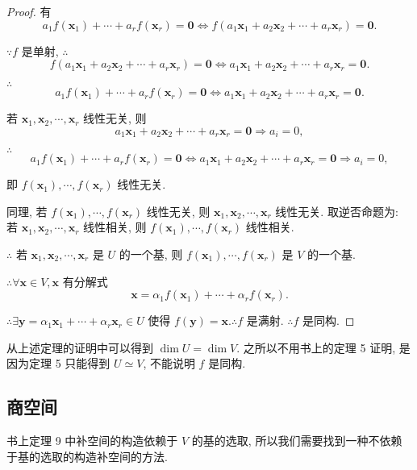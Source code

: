 \documentclass{ctexart}
\begin{document}
\begin{proof}
    有
    \[a_1f(\boldsymbol{x}_1)+\cdots+a_rf(\boldsymbol{x}_r)=\boldsymbol{0}\Leftrightarrow f(a_1\boldsymbol{x}_1+a_2\boldsymbol{x}_2+\cdots+a_r\boldsymbol{x}_r)=\boldsymbol{0}.\]

    $\because f$ 是单射, $\therefore$
    \[f(a_1\boldsymbol{x}_1+a_2\boldsymbol{x}_2+\cdots+a_r\boldsymbol{x}_r)=\boldsymbol{0}\Leftrightarrow a_1\boldsymbol{x}_1+a_2\boldsymbol{x}_2+\cdots+a_r\boldsymbol{x}_r=\boldsymbol{0}.\]

    $\therefore$
    \[a_1f(\boldsymbol{x}_1)+\cdots+a_rf(\boldsymbol{x}_r)=\boldsymbol{0}\Leftrightarrow a_1\boldsymbol{x}_1+a_2\boldsymbol{x}_2+\cdots+a_r\boldsymbol{x}_r=\boldsymbol{0}.\]
    
    若 $\boldsymbol{x}_1,\boldsymbol{x}_2,\cdots,\boldsymbol{x}_r$ 线性无关, 则
    \[a_1\boldsymbol{x}_1+a_2\boldsymbol{x}_2+\cdots+a_r\boldsymbol{x}_r=\boldsymbol{0}\Rightarrow a_i=0,\]

    $\therefore$
    \[a_1f(\boldsymbol{x}_1)+\cdots+a_rf(\boldsymbol{x}_r)=\boldsymbol{0}\Leftrightarrow a_1\boldsymbol{x}_1+a_2\boldsymbol{x}_2+\cdots+a_r\boldsymbol{x}_r=\boldsymbol{0}\Rightarrow a_i=0,\]

    即 $f(\boldsymbol{x}_1),\cdots,f(\boldsymbol{x}_r)$ 线性无关.

    同理, 若 $f(\boldsymbol{x}_1),\cdots,f(\boldsymbol{x}_r)$ 线性无关, 则 $\boldsymbol{x}_1,\boldsymbol{x}_2,\cdots,\boldsymbol{x}_r$ 线性无关. 取逆否命题为: 若 $\boldsymbol{x}_1,\boldsymbol{x}_2,\cdots,\boldsymbol{x}_r$ 线性相关, 则 $f(\boldsymbol{x}_1),\cdots,f(\boldsymbol{x}_r)$ 线性相关.

    $\therefore$ 若 $\boldsymbol{x}_1,\boldsymbol{x}_2,\cdots,\boldsymbol{x}_r$ 是 $U$ 的一个基, 则 $f(\boldsymbol{x}_1),\cdots,f(\boldsymbol{x}_r)$ 是 $V$ 的一个基.

    $\therefore\forall\boldsymbol{x}\in V,\boldsymbol{x}$ 有分解式
    \[\boldsymbol{x}=\alpha_1f(\boldsymbol{x}_1)+\cdots+\alpha_rf(\boldsymbol{x}_r).\]

    $\therefore\exists\boldsymbol{y}=\alpha_1\boldsymbol{x}_1+\cdots+\alpha_r\boldsymbol{x}_r\in U$ 使得 $f(\boldsymbol{y})=\boldsymbol{x}.\therefore f$ 是满射. $\therefore f$ 是同构.
\end{proof}
\begin{note}
    从上述定理的证明中可以得到 $\dim U=\dim V$. 之所以不用书上的定理 5 证明, 是因为定理 5 只能得到 $U\simeq V$, 不能说明 $f$ 是同构.
\end{note}
\subsection{商空间}
书上定理 9 中补空间的构造依赖于 $V$ 的基的选取, 所以我们需要找到一种不依赖于基的选取的构造补空间的方法.
\end{document}
